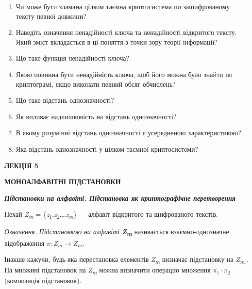 \liststyleWWviiiNumx
\begin{enumerate}
\item Чи може бути зламана цілком таємна криптосистема по зашифрованому тексту
певної довжини?
\item Наведіть означення ненадійності ключа та ненадійності відкритого тексту.
Який зміст вкладається в ці поняття з точки зору теорії інформації?
\item Що таке функція ненадійності ключа?
\item Якою повинна бути ненадійність ключа, щоб його можна було знайти по
криптограмі, якщо виконати певний обсяг обчислень?
\item Що таке відстань однозначності?
\item Як впливає надлишковість на відстань однозначності?
\item В якому розумінні відстань однозначності є усередненою характеристикою?
\item Яка відстань однозначності у цілком таємної криптосистеми? 
\end{enumerate}

\bigskip


\bigskip


\bigskip

{\bfseries
ЛЕКЦІЯ  5}


\bigskip

{\centering\bfseries
МОНОАЛФАВІТНІ  ПІДСТАНОВКИ
\par}


\bigskip


\bigskip

{\centering\bfseries\itshape
Підстановки на алфавіті. Підстановка як криптографічне перетворення
\par}


\bigskip


\bigskip

Нехай \textit{Z}\textit{\textsubscript{m}} =
\{\textit{z}\textsubscript{1},\textit{z}\textsubscript{2},…\textit{z}\textit{\textsubscript{m}}\}
--- алфавіт відкритого та шифрованого текстів.

\textit{Означення.}\textit{ Підстановкою на алфавіті}\textbf{\textit{
}}\textbf{\textit{Z}}\textbf{\textit{\textsubscript{m}}} називається
взаємно-однозначне відображення  $\pi :Z_{m}\rightarrow Z_m$.

Інакше кажучи, будь-яка перестановка елементів
\textit{Z}\textit{\textsubscript{m}}\textsubscript{ } визначає підстановку на
\textit{Z}\textit{\textsubscript{m}}\textsubscript{ }. На множині підстановок
на \textit{Z}\textit{\textsubscript{m}} можна визначити операцію множення 
$\pi _{1}\cdot \pi _2$ (композиція підстановок).

